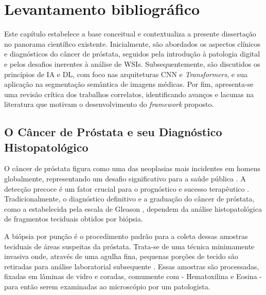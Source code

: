 \chapter{Levantamento bibliográfico}\label{chp:fundamentacao} %

Este capítulo estabelece a base conceitual e contextualiza a presente dissertação no panorama científico existente. Inicialmente, são abordados os aspectos clínicos e diagnósticos do câncer de próstata, seguidos pela introdução à patologia digital e pelos desafios inerentes à análise de WSIs. Subsequentemente, são discutidos os princípios de IA e DL, com foco nas arquiteturas CNN e \textit{Transformers}, e sua aplicação na segmentação semântica de imagens médicas. Por fim, apresenta-se uma revisão crítica dos trabalhos correlatos, identificando avanços e lacunas na literatura que motivam o desenvolvimento do \textit{framework} proposto. %

\section{O Câncer de Próstata e seu Diagnóstico Histopatológico}\label{sec:cancer_prostata_diagnostico}

O câncer de próstata figura como uma das neoplasias mais incidentes em homens globalmente, representando um desafio significativo para a saúde pública \cite{Ferlay_GCO_2024}. A detecção precoce é um fator crucial para o prognóstico e sucesso terapêutico \cite{Beltran2019}. Tradicionalmente, o diagnóstico definitivo e a graduação do câncer de próstata, como a estabelecida pela escala de Gleason \cite{Gleason1966, Mellinger1967}, dependem da análise histopatológica de fragmentos teciduais obtidos por biópsia.

A biópsia por punção é o procedimento padrão para a coleta dessas amostras teciduais de áreas suspeitas da próstata. Trata-se de uma técnica minimamente invasiva onde, através de uma agulha fina, pequenas porções de tecido são retiradas para análise laboratorial subsequente \cite{Epstein2015}. %
Essas amostras são processadas, fixadas em lâminas de vidro e coradas, comumente com  - Hematoxilina e Eosina - para então serem examinadas ao microscópio por um patologista.

